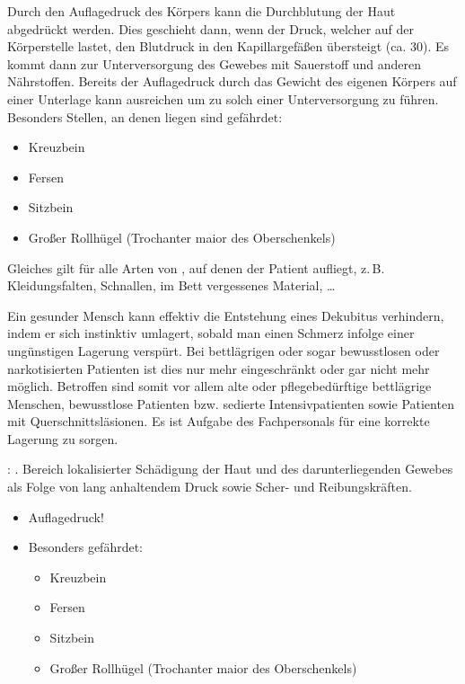\TextSlide
{\TxBeschreibung}
{\label{topic:dekubitus}%
Durch den Auflagedruck des Körpers kann die 
Durchblutung der Haut abgedrückt werden. Dies geschieht dann,
wenn der Druck, welcher auf der Körperstelle lastet, den
Blutdruck in den Kapillargefäßen übersteigt (ca. 30\MmHg*).
Es kommt dann zur Unterversorgung des Gewebes mit Sauerstoff
und anderen Nährstoffen. 
%
Bereits der Auflagedruck 
durch das Gewicht des eigenen Körpers 
auf einer Unterlage kann ausreichen 
um zu solch einer
Unterversorgung zu führen. 
%
Besonders Stellen, 
an denen  
liegen sind gefährdet:
\begin{itemize}
  \item Kreuzbein
  \item Fersen
  \item Sitzbein
  \item Großer Rollhügel (Trochanter maior des
  Oberschenkels)
\end{itemize}
Gleiches gilt für alle Arten
von , auf denen der Patient aufliegt,
z.\,B.
Kleidungsfalten, Schnallen, im Bett vergessenes
Material, \ldots 

Ein gesunder Mensch kann effektiv 
die Entstehung eines Dekubitus verhindern, indem er
sich instinktiv umlagert, sobald man einen Schmerz infolge
einer ungünstigen Lagerung verspürt. Bei bettlägrigen oder 
sogar bewusstlosen oder narkotisierten
Patienten ist dies nur mehr eingeschränkt oder gar nicht
mehr möglich.
%
Betroffen sind somit vor allem alte 
oder pflegebedürftige bettlägrige Menschen, 
bewusstlose Patienten 
bzw. sedierte Intensivpatienten 
sowie Patienten mit Querschnittsläsionen. 
%
Es ist Aufgabe des Fachpersonals für eine
korrekte Lagerung zu sorgen.

}
{: . Bereich
lokalisierter Schädigung der Haut und des darunterliegenden Gewebes als Folge von 
lang anhaltendem Druck sowie Scher- und Reibungskräften.
\begin{itemize}
  \item Auflagedruck!
  \item Besonders gefährdet:
  \begin{itemize}
    \item Kreuzbein
    \item Fersen
    \item Sitzbein
    \item Großer Rollhügel (Trochanter maior des
    Oberschenkels)
  \end{itemize}
\end{itemize}
}
{}
{}
{}


